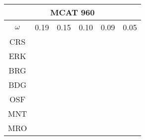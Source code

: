 \documentclass[a4paper,12pt]{article}
\begin{document}
\begin{tabular}{|c|c|c|c|c|c|}%
         \hline \multicolumn{6}{|c|}{MCAT 960} \\ \hline
         $\omega$&0.19&0.15&0.10&0.09&0.05\\ \hline %
        CRS&\cellcolor[HTML]{E41A1C}&\cellcolor[HTML]{E41A1C}&\cellcolor[HTML]{E41A1C}&\cellcolor[HTML]{E41A1C}&\cellcolor[HTML]{E41A1C}\\ \hline %
        ERK&\cellcolor[HTML]{E41A1C}&\cellcolor[HTML]{E41A1C}&\cellcolor[HTML]{E41A1C}&\cellcolor[HTML]{E41A1C}&\cellcolor[HTML]{E41A1C}\\ \hline %
        BRG&\cellcolor[HTML]{E41A1C}&\cellcolor[HTML]{E41A1C}&\cellcolor[HTML]{E41A1C}&\cellcolor[HTML]{377EB8}&\cellcolor[HTML]{377EB8}\\ \hline %
        BDG&\cellcolor[HTML]{377EB8}&\cellcolor[HTML]{377EB8}&\cellcolor[HTML]{377EB8}&\cellcolor[HTML]{377EB8}&\cellcolor[HTML]{377EB8}\\ \hline %
        OSF&\cellcolor[HTML]{4DAF4A}&\cellcolor[HTML]{377EB8}&\cellcolor[HTML]{377EB8}&\cellcolor[HTML]{4DAF4A}&\cellcolor[HTML]{377EB8}\\ \hline %
        MNT&\cellcolor[HTML]{4DAF4A}&\cellcolor[HTML]{4DAF4A}&\cellcolor[HTML]{377EB8}&\cellcolor[HTML]{4DAF4A}&\cellcolor[HTML]{4DAF4A}\\ \hline %
        MRO&\cellcolor[HTML]{4DAF4A}&\cellcolor[HTML]{4DAF4A}&\cellcolor[HTML]{4DAF4A}&\cellcolor[HTML]{4DAF4A}&\cellcolor[HTML]{4DAF4A}\\ \hline %

\end{tabular}
\end{document}
